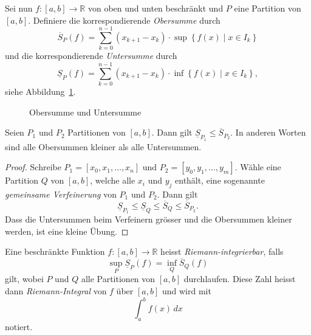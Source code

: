 \documentclass[../main.tex]{subfiles}
\begin{document}
Sei nun $f \colon [a, b] \to \mathbb{R}$ von oben und
unten beschränkt und $P$ eine Partition von $[a, b]$.
Definiere die korrespondierende \emph{Obersumme} durch
\[
  \overline S_P(f)
  = \sum_{k = 0}^{n - 1} (x_{k + 1} - x_k)
  \cdot \sup \left\{f(x) \mid x \in I_k \right\}
\]
und die korrespondierende \emph{Untersumme} durch
\[
  \underline S_P(f)
  = \sum_{k = 0}^{n - 1} (x_{k + 1} - x_k)
  \cdot \inf \left\{f(x) \mid x \in I_k \right\},
\]
siehe Abbildung~\ref{fig:riemann}.

\begin{figure}[htb] 
  \centering
  \begin{minipage}{0.50\textwidth}
    \centering

    
  \end{minipage}%
  \begin{minipage}{0.50\textwidth}
    \centering

    
  \end{minipage}%
  \caption{Obersumme und Untersumme}%
  \label{fig:riemann}
\end{figure}

\begin{lemma*}
  Seien $P_1$ und $P_2$ Partitionen
  von $[a, b]$. Dann gilt
  $\underline S_{P_1} \leq \overline S_{P_2}$.
  In anderen Worten sind alle Obersummen
  kleiner als alle Untersummen.
\end{lemma*}

\begin{proof}
  Schreibe
  $P_1 = [x_0, x_1, \dots, x_n]$ 
  und
  $P_2 = [y_0, y_1, \dots, y_m]$.
  Wähle eine Partition $Q$ von
  $[a,b]$, welche alle $x_i$ und
  $y_j$ enthält, eine sogenannte
  \emph{gemeinsame Verfeinerung}
  von $P_1$ und $P_2$.
  Dann gilt
  \[
    \underline S_{P_1} \leq \underline S_Q
    \leq \overline S_Q
    \leq \overline S_{P_2}.
  \]
  Dass die Untersummen beim Verfeinern
  grösser und die Obersummen kleiner
  werden, ist eine kleine Übung.
\end{proof}

\begin{definition}
  Eine beschränkte Funktion
  $f \colon [a, b] \to \mathbb{R}$ heisst
  \emph{Riemann-integrierbar}, falls
  \[
    \sup_{P} \underline S_P(f) = \inf_{Q} \overline S_Q(f)
  \]
  gilt,
  wobei $P$ und $Q$ alle Partitionen von
  $[a, b]$ durchlaufen.
  Diese Zahl heisst dann \emph{Riemann-Integral}
  von $f$ über $[a,b]$ und wird
  mit
  \[
    \int_{a}^{b} f(x) \, dx
  \]
  notiert.
\end{definition}
\end{document}
